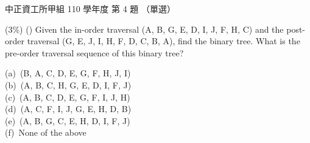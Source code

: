 \begin{pastexam}[label={px:ccu-110-swa-02}]{中正資工所甲組 110 學年度 第 4 題}
（單選）

(3\%) (\quad) Given the in-order traversal (A, B, G, E, D, I, J, F, H, C) and the post-order
traversal (G, E, J, I, H, F, D, C, B, A), find the binary tree. What is the pre-order traversal
sequence of this binary tree?

(a)~(B, A, C, D, E, G, F, H, J, I)\\
(b)~(A, B, C, H, G, E, D, I, F, J)\\
(c)~(A, B, C, D, E, G, F, I, J, H)\\
(d)~(A, C, F, I, J, G, E, H, D, B)\\
(e)~(A, B, G, C, E, H, D, I, F, J)\\
(f)~None of the above
\end{pastexam}

